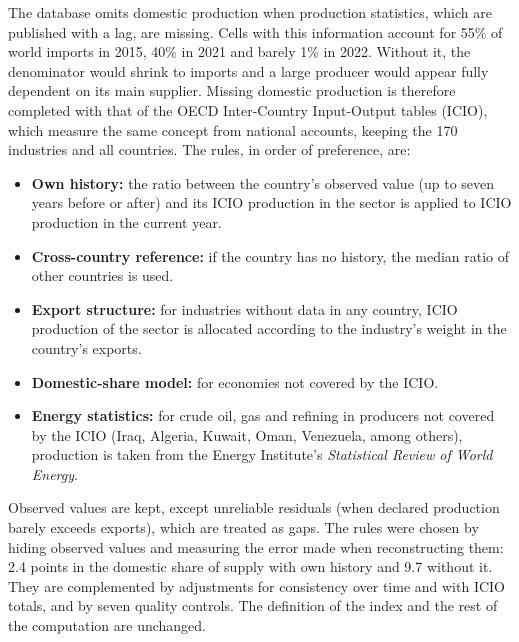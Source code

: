 \documentclass[final,1p,times,authoryear]{elsarticle}
\begin{document}
The database omits domestic production when production statistics, which are published with a lag, are missing. Cells with this information account for 55\% of world imports in 2015, 40\% in 2021 and barely 1\% in 2022. Without it, the denominator would shrink to imports and a large producer would appear fully dependent on its main supplier. Missing domestic production is therefore completed with that of the OECD Inter-Country Input-Output tables (ICIO), which measure the same concept from national accounts, keeping the 170 industries and all countries. The rules, in order of preference, are:
\begin{itemize}
    \item \textbf{Own history:} the ratio between the country's observed value (up to seven years before or after) and its ICIO production in the sector is applied to ICIO production in the current year.
    \item \textbf{Cross-country reference:} if the country has no history, the median ratio of other countries is used.
    \item \textbf{Export structure:} for industries without data in any country, ICIO production of the sector is allocated according to the industry's weight in the country's exports.
    \item \textbf{Domestic-share model:} for economies not covered by the ICIO.
    \item \textbf{Energy statistics:} for crude oil, gas and refining in producers not covered by the ICIO (Iraq, Algeria, Kuwait, Oman, Venezuela, among others), production is taken from the Energy Institute's \textit{Statistical Review of World Energy}.
\end{itemize}
Observed values are kept, except unreliable residuals (when declared production barely exceeds exports), which are treated as gaps. The rules were chosen by hiding observed values and measuring the error made when reconstructing them: 2.4 points in the domestic share of supply with own history and 9.7 without it. They are complemented by adjustments for consistency over time and with ICIO totals, and by seven quality controls. The definition of the index and the rest of the computation are unchanged.
\end{document}
